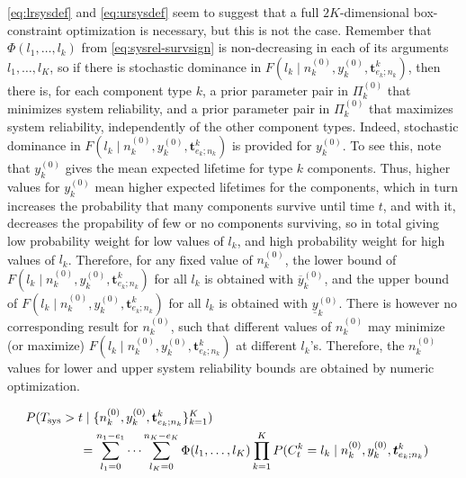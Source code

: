 \documentclass[Journal,SectionNumbers,InsideFigs]{ascelike}
\newcommand{\mbf}[1]{\mathbf{#1}}
\renewcommand{\vec}[1]{{\bm#1}}
\newcommand{\uz}{^{(0)}} %
\newcommand{\ul}[1]{\underline{#1}}
\newcommand{\ol}[1]{\overline{#1}}
\def\Tsys{T_\text{sys}}
\def\ykz{y\uz_k}
\def\ykzl{\ul{y}\uz_k}
\def\ykzu{\ol{y}\uz_k}
\def\nkz{n\uz_k}
\def\PkZ{\Pi\uz_k}
\begin{document}
\eqref{eq:lrsysdef} and \eqref{eq:ursysdef} seem to suggest that
a full $2K$-dimensional box-constraint optimization is necessary,
but this is not the case.
Remember that $\Phi(l_1,\ldots,l_k)$ from \eqref{eq:sysrel-survsign} is non-decreasing in each of its arguments $l_1,\ldots,l_K$,
so if there is stochastic dominance in $F(l_k \mid \nkz,\ykz,\vec{t}^k_{e_k;n_k})$,
then there is, for each component type $k$,
a prior parameter pair in $\PkZ$ that minimizes system reliability, and
a prior parameter pair in $\PkZ$ that maximizes system reliability,
independently of the other component types. 
Indeed, stochastic dominance in $F(l_k \mid \nkz,\ykz,\vec{t}^k_{e_k;n_k})$ is provided for $\ykz$.
To see this, note that $\ykz$ gives the mean expected lifetime for type $k$ components.
Thus, higher values for $\ykz$ mean higher expected lifetimes for the components,
which in turn increases the probability that many components survive until time $t$,
and with it, decreases the propability of few or no components surviving,
so in total giving low probability weight for low values of $l_k$,
and high probability weight for high values of $l_k$. 
Therefore, for any fixed value of $\nkz$, 
the lower bound of $F(l_k \mid \nkz,\ykz,\vec{t}^k_{e_k;n_k})$ for all $l_k$ is obtained with $\ykzu$, and
the upper bound of $F(l_k \mid \nkz,\ykz,\vec{t}^k_{e_k;n_k})$ for all $l_k$ is obtained with $\ykzl$.
%
%
There is however no corresponding result for $\nkz$,
such that different values of $\nkz$ may minimize (or maximize) $F(l_k \mid \nkz,\ykz,\vec{t}^k_{e_k;n_k})$ at different $l_k$'s.
Therefore, the $\nkz$ values for lower and upper system reliability bounds are obtained by numeric optimization.
%
\iffalse %
\begin{linenomath*}
\begin{align} \label{eq:25}
\lefteqn{%
P(\Tsys > t\mid\{\nkz,\ykz, \mbf{t}^k_{e_k;n_k}\}_{k=1}^K)} \hspace*{10ex}\nonumber\\ 
 &= \sum_{l_1=0}^{n_1-e_1} \cdots \sum_{l_K=0}^{n_K-e_K} \Phi(l_1,\ldots,l_K) \prod_{k=1}^K
    P(C^k_t = l_k\mid\nkz,\ykz, \vec{t}^k_{e_k;n_k})
\end{align}
\end{linenomath*}
\end{document}
